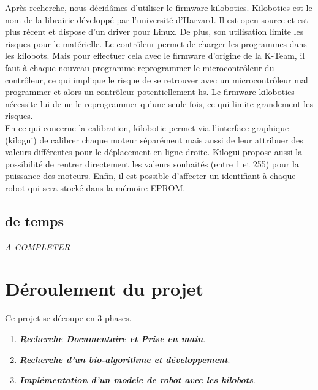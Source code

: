 \documentclass[a4paper,8pt]{report}
\begin{document}
\smallskip
Apr\`es recherche, nous d\'ecid\^ames d'utiliser le firmware kilobotics. Kilobotics est le nom de la librairie d\'evelopp\'e par l'universit\'e d'Harvard. Il est open-source et est plus r\'ecent et dispose d'un driver pour Linux. De plus, son utilisation limite les risques pour le mat\'erielle. Le contr\^oleur permet de charger les programmes dans les kilobots. Mais pour effectuer cela avec le firmware d'origine de la K-Team, il faut \`a chaque nouveau programme reprogrammer le microcontr\^oleur du contr\^oleur, ce qui implique le risque de se retrouver avec un microcontr\^oleur mal programmer et alors un contr\^oleur potentiellement hs. Le firmware kilobotics n\'ecessite lui de ne le reprogrammer qu'une seule fois, ce qui limite grandement les risques. \\
En ce qui concerne la calibration, kilobotic permet via l'interface graphique (kilogui) de calibrer chaque moteur s\'epar\'ement mais aussi de leur attribuer des valeurs diff\'erentes pour le d\'eplacement en ligne droite. Kilogui propose aussi la possibilit\'e de rentrer directement les valeurs souhait\'es (entre 1 et 255) pour la puissance des moteurs. Enfin, il est possible d'affecter un identifiant \`a chaque robot qui sera stock\'e dans la m\'emoire EPROM.

\section*{de temps}\label{sec:name}

\textit{A COMPLETER}


\chapter{D\'eroulement du projet}

Ce projet se d\'ecoupe en 3 phases.\\

\begin{enumerate}[{Phase}-I ]
\item \textit{\textbf{Recherche Documentaire et Prise en main}}.
\item \textit{\textbf{Recherche d'un bio-algorithme et d\'eveloppement}}.
\item \textit{\textbf{Impl\'ementation d'un modele de robot avec les kilobots}}.
\end{enumerate}
\end{document}
